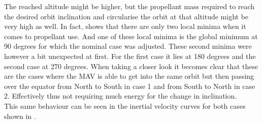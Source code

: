 \noindent
The reached altitude might be higher, but the propellant mass required to reach the desired orbit inclination and circularise the orbit at that altitude might be very high as well. In fact,  shows that there are only two local minima when it comes to propellant use. And one of these local minima is the global minimum at 90 degrees for which the nominal case was adjusted. These second minima were however a bit unexpected at first. For the first case it lies at 180 degrees and the second case at 270 degrees. When taking a closer look it becomes clear that these are the cases where the \ac{MAV} is able to get into the same orbit but then passing over the equator from North to South in case 1 and from South to North in case 2. Effectively thus not requiring much energy for the change in inclination.\\

\noindent
This same behaviour can be seen in the inertial velocity curves for both cases shown in . 


